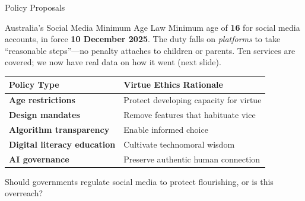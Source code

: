 ﻿\documentclass[aspectratio=169,11pt]{beamer}
\begin{document}
\begin{frame}{Policy Proposals}
\begin{block}{Australia's Social Media Minimum Age Law}
Minimum age of \textbf{16} for social media accounts, in force \textbf{10 December 2025}. The duty falls on \emph{platforms} to take ``reasonable steps''---no penalty attaches to children or parents. Ten services are covered; we now have real data on how it went (next slide).
\end{block}

\vspace{0.2cm}
\begin{table}[h]
\centering
\small
\begin{tabular}{>{\bfseries}l p{6cm}}
\toprule
Policy Type & Virtue Ethics Rationale \\
\midrule
Age restrictions & Protect developing capacity for virtue \\
Design mandates & Remove features that habituate vice \\
Algorithm transparency & Enable informed choice \\
Digital literacy education & Cultivate technomoral wisdom \\
AI governance & Preserve authentic human connection \\
\bottomrule
\end{tabular}
\end{table}

\begin{discussionbox}[Discussion]
Should governments regulate social media to protect flourishing, or is this overreach?
\end{discussionbox}
\end{frame}
\end{document}
